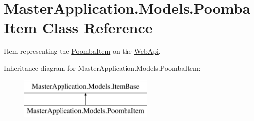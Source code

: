 \hypertarget{class_master_application_1_1_models_1_1_poomba_item}{}\section{Master\+Application.\+Models.\+Poomba\+Item Class Reference}
\label{class_master_application_1_1_models_1_1_poomba_item}


Item representing the \mbox{\hyperlink{class_master_application_1_1_models_1_1_poomba_item}{Poomba\+Item}} on the \mbox{\hyperlink{namespace_web_api}{Web\+Api}}.  


Inheritance diagram for Master\+Application.\+Models.\+Poomba\+Item\+:\begin{figure}[H]
\begin{center}
\leavevmode
\includegraphics[height=2.000000cm]{class_master_application_1_1_models_1_1_poomba_item}
\end{center}
\end{figure}
